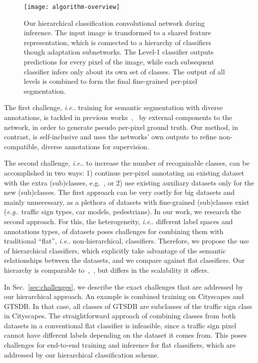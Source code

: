 \documentclass[letterpaper, 10 pt, conference]{ieeeconf}
\makeatletter
\DeclareRobustCommand\onedot{\futurelet\@let@token\@onedot}
\def\@onedot{\ifx\@let@token.\else.\null\fi\xspace}
\def\eg{\emph{e.g}\onedot}
\def\ie{\emph{i.e}\onedot}
\makeatother
\begin{document}
\begin{figure}[tb]
	\begin{center}
		\texttt{[image: algorithm-overview]}
	\end{center}
	\caption{Our hierarchical classification convolutional network during inference. The input image is transformed to a shared feature representation, which is connected to a hierarchy of classifiers though adaptation subnetworks. The Level-1 classifier outputs predictions for every pixel of the image, while each subsequent classifier infers only about its own set of classes. The output of all levels is combined to form the final fine-grained per-pixel segmentation.}
	\label{fig:algorithm-overview}
\end{figure}

The first challenge, \ie training for semantic segmentation with diverse annotations, is tackled in previous works~\cite{ye2018diverse},~\cite{papandreou2015weakly} by external components to the network, in order to generate pseudo per-pixel ground truth. Our method, in contrast, is self-inclusive and uses the networks' own outputs to refine non-compatible, diverse annotations for supervision.

The second challenge, \ie to increase the number of recognizable classes, can be accomplished in two ways: 1) continue per-pixel annotating an existing dataset with the extra (sub)classes, e.g.~\cite{petrovai2017semi}, or 2) use existing auxiliary datasets only for the new (sub)classes. The first approach can be very costly for big datasets and mainly unnecessary, as a plethora of datasets with fine-grained (sub)classes exist (\eg traffic sign types, car models, pedestrians). In our work, we research the second approach. For this, the heterogeneity, \ie different label spaces and annotations types, of datasets poses challenges for combining them with traditional ``flat'', \ie non-hierarchical, classifiers. Therefore, we propose the use of hierarchical classifiers, which explicitly take advantage of the semantic relationships between the datasets, and we compare against flat classifiers. Our hierarchy is comparable to~\cite{zhou2016hierarchical},~\cite{mao2016hierarchical}, but differs in the scalability it offers.

In Sec.~\ref{sec:challenges}, we describe the exact challenges that are addressed by our hierarchical approach. An example is combined training on Cityscapes and GTSDB. In that case, all classes of GTSDB are subclasses of the traffic sign class in Cityscapes. The straightforward approach of combining classes from both datasets in a conventional flat classifier is infeasible, since a traffic sign pixel cannot have different labels depending on the dataset it comes from. This poses challenges for end-to-end training and inference for flat classifiers, which are addressed by our hierarchical classification scheme.
\end{document}

